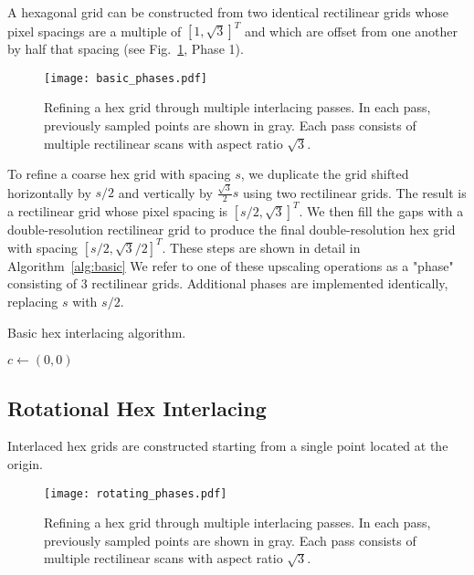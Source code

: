 \documentclass{article}
\begin{document}
A hexagonal grid can be constructed from two identical rectilinear grids
whose pixel spacings are a multiple of $[1, \sqrt{3}]^T$ and which are offset from one another by half that spacing (see Fig.~\ref{fig:basicphases}, Phase 1).

\begin{figure}[ht]
\centering
\texttt{[image: basic\_phases.pdf]}
\caption{
\label{fig:basicphases} Refining a hex grid through multiple interlacing passes.
%
In each pass, previously sampled points are shown in gray.
%
Each pass consists of multiple rectilinear scans with aspect ratio $\sqrt{3}$.
}
\end{figure}

To refine a coarse hex grid with spacing $s$, we duplicate the grid shifted horizontally by $s/2$ and vertically by $\frac{\sqrt{3}}{2} s$ using two rectilinear grids.
%
The result is a rectilinear grid whose pixel spacing is $[s/2, \sqrt{3}]^T$.
%
We then fill the gaps with a double-resolution rectilinear grid to produce the final double-resolution hex grid with spacing $[s/2, \sqrt{3}/2]^T$.
%
These steps are shown in detail in Algorithm~\ref{alg:basic}
%
We refer to one of these upscaling operations as a "phase" consisting of 3 rectilinear grids.
%
Additional phases are implemented identically, replacing $s$ with $s/2$.

\begin{algorithm}
\caption{Basic hex interlacing algorithm.}\label{alg:basic}
\begin{algorithmic}
	\State $c \gets (0, 0)$
\end{algorithmic}
\end{algorithm}

\subsection{Rotational Hex Interlacing}
\label{triple-grid-interlacing}

Interlaced hex grids are constructed starting from a single point
located at the origin.

\begin{figure}[ht]
\centering
\texttt{[image: rotating\_phases.pdf]}
\caption{
\label{fig:rotatingphases} Refining a hex grid through multiple interlacing passes.
%
In each pass, previously sampled points are shown in gray.
%
Each pass consists of multiple rectilinear scans with aspect ratio $\sqrt{3}$.
}
\end{figure}
\end{document}

